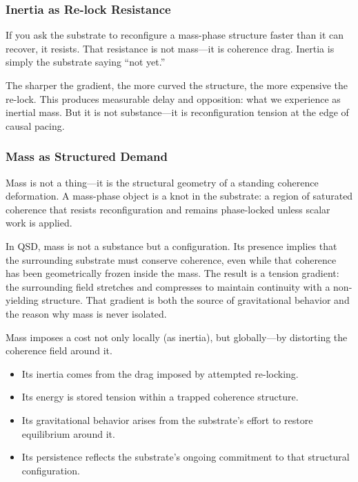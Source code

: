 \documentclass[entropy,article,submit,pdftex,moreauthors]{Definitions/mdpi}
\begin{document}
\subsubsection{Inertia as Re-lock Resistance}

If you ask the substrate to reconfigure a mass-phase structure faster than it can recover, it resists. That resistance is not mass—it is coherence drag. Inertia is simply the substrate saying “not yet.”

The sharper the gradient, the more curved the structure, the more expensive the re-lock. This produces measurable delay and opposition: what we experience as inertial mass. But it is not substance—it is reconfiguration tension at the edge of causal pacing.

\subsubsection{Mass as Structured Demand}

Mass is not a thing—it is the structural geometry of a standing coherence deformation. A mass-phase object is a knot in the substrate: a region of saturated coherence that resists reconfiguration and remains phase-locked unless scalar work is applied.

In QSD, mass is not a substance but a configuration. Its presence implies that the surrounding substrate must conserve coherence, even while that coherence has been geometrically frozen inside the mass. The result is a tension gradient: the surrounding field stretches and compresses to maintain continuity with a non-yielding structure. That gradient is both the source of gravitational behavior and the reason why mass is never isolated.

Mass imposes a cost not only locally (as inertia), but globally—by distorting the coherence field around it.

\begin{itemize}
    \item Its inertia comes from the drag imposed by attempted re-locking.
    \item Its energy is stored tension within a trapped coherence structure.
    \item Its gravitational behavior arises from the substrate's effort to restore equilibrium around it.
    \item Its persistence reflects the substrate's ongoing commitment to that structural configuration.
\end{itemize}
\end{document}
